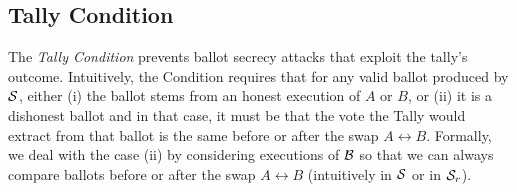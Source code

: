 



\subsection{Tally Condition}
\label{sec:condi:tally}
The {\em Tally Condition} prevents ballot secrecy attacks that exploit the tally's outcome.
Intuitively, the Condition requires that for any valid
ballot produced by $\S$,
either
(i) the ballot stems from an honest execution
of $A$ or $B$, or
(ii) it is a dishonest ballot and in that case, it must be that the vote the Tally would extract from that ballot
is the same before or after the swap $A\leftrightarrow B$. Formally, we deal with the case (ii) by considering
executions of $\biproc$ so that we can always compare ballots before or after the swap $A\leftrightarrow B$
(\ie intuitively in $\S$ or in $\S_r$).

